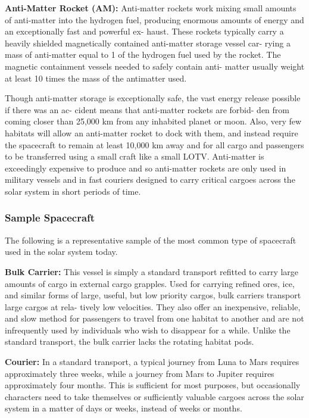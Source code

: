 \textbf{Anti-Matter Rocket (AM):} Anti-matter rockets 
work mixing small amounts of anti-matter into the 
hydrogen fuel, producing enormous amounts of 
energy and an exceptionally fast and powerful ex-
haust. These rockets typically carry a heavily shielded 
magnetically contained anti-matter storage vessel car-
rying a mass of anti-matter equal to 1%
of the hydrogen fuel used by the rocket. The magnetic 
containment vessels needed to safely contain anti-
matter usually weight at least 10 times the mass of 
the antimatter used.

Though anti-matter storage is exceptionally safe, 
the vast energy release possible if there was an ac-
cident means that anti-matter rockets are forbid-
den from coming closer than 25,000 km from any 
inhabited planet or moon. Also, very few habitats 
will allow an anti-matter rocket to dock with them, 
and instead require the spacecraft to remain at least 
10,000 km away and for all cargo and passengers to 
be transferred using a small craft like a small LOTV. 
Anti-matter is exceedingly expensive to produce and 
so anti-matter rockets are only used in military vessels 
and in fast couriers designed to carry critical cargoes 
across the solar system in short periods of time.

\subsubsection{Sample Spacecraft}

The following is a representative sample of the most 
common type of spacecraft used in the solar system today.

\textbf{Bulk Carrier: }This vessel is simply a standard 
transport refitted to carry large amounts of cargo in 
external cargo grapples. Used for carrying refined ores, 
ice, and similar forms of large, useful, but low priority 
cargos, bulk carriers transport large cargos at rela-
tively low velocities. They also offer an inexpensive, 
reliable, and slow method for passengers to travel 
from one habitat to another and are not infrequently 
used by individuals who wish to disappear for a while. 
Unlike the standard transport, the bulk carrier lacks 
the rotating habitat pods.

\textbf{Courier:} In a standard transport, a typical journey 
from Luna to Mars requires approximately three 
weeks, while a journey from Mars to Jupiter requires 
approximately four months. This is sufficient for most 
purposes, but occasionally characters need to take 
themselves or sufficiently valuable cargoes across the 
solar system in a matter of days or weeks, instead of 
weeks or months.

